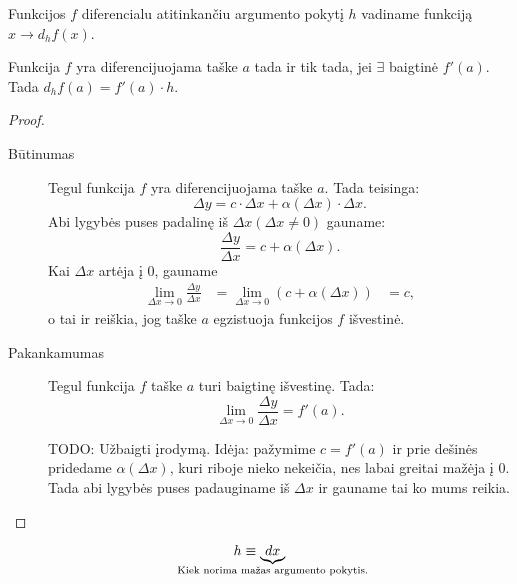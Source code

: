 \begin{defn}
  Funkcijos $f$ diferencialu atitinkančiu argumento pokytį $h$ vadiname
  funkciją $x \to d_{h} f(x)$.
\end{defn}

\begin{prop}
  Funkcija $f$ yra diferencijuojama taške $a$ tada ir tik tada, jei
  $\exists$ baigtinė $f'(a)$. Tada $d_{h} f(a) = f'(a) \cdot h$.
  \begin{proof}
    \begin{description}
      \item[Būtinumas] Tegul funkcija $f$ yra diferencijuojama taške 
        $a$. Tada teisinga:
        \begin{equation*}
          \Delta y = c \cdot \Delta x + \alpha(\Delta x) \cdot \Delta x.
        \end{equation*}
        Abi lygybės puses padalinę iš $\Delta x (\Delta x \neq 0)$ gauname:
        \begin{equation*}
          \frac{\Delta y}{\Delta x} = c + \alpha(\Delta x).
        \end{equation*}
        Kai $\Delta x$ artėja į 0, gauname
        \begin{align*}
          \lim_{\Delta x \to 0} \frac{\Delta y}{\Delta x}
          &= \lim_{\Delta x \to 0} (c + \alpha(\Delta x))
          &= c,
        \end{align*}
        o tai ir reiškia, jog taške $a$ egzistuoja funkcijos $f$ išvestinė.
      \item[Pakankamumas] Tegul funkcija $f$ taške $a$ turi baigtinę 
        išvestinę. Tada:
        \begin{equation*}
          \lim_{\Delta x \to 0} \frac{\Delta y}{\Delta x} = f'(a).
        \end{equation*}

        TODO: Užbaigti įrodymą. Idėja: pažymime $c = f'(a)$ ir prie
        dešinės pridedame $\alpha(\Delta x)$, kuri riboje nieko nekeičia,
        nes labai greitai mažėja į 0. Tada abi lygybės puses padauginame 
        iš $\Delta x$ ir gauname tai ko mums reikia.
    \end{description}
  \end{proof}
\end{prop}

\begin{notation}
  \begin{equation*}
    h \equiv \underbrace{dx}_{\mathclap{
      \text{Kiek norima mažas argumento pokytis.}}}
  \end{equation*}
\end{notation}

